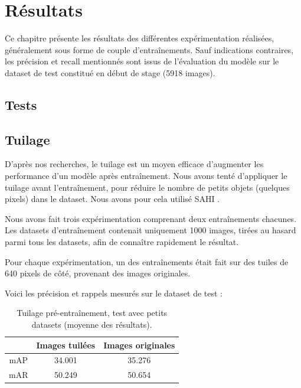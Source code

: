 \chapter{Résultats}\label{resultats}

Ce chapitre présente les résultats des différentes expérimentation réalisées, 
généralement sous forme de couple d'entraînements. Sauf indications contraires, 
les précision et recall mentionnés sont issus de l'évaluation du modèle sur le 
dataset de test constitué en début de stage (5918 images).

\section{Tests}


\section{Tuilage}

D'après nos recherches, le tuilage est un moyen efficace d'augmenter les performance d'un modèle après 
entraînement. Nous avons tenté d'appliquer le tuilage avant 
l'entraînement, pour réduire le nombre de petits objets (quelques pixels) dans le dataset. 
Nous avons pour cela utilisé SAHI \cite{Akyon_Altinuc_Temizel_2022}.

Nous avons fait trois expérimentation comprenant deux entraînements chacunes. 
Les datasets d'entraînement contenait uniquement 1000 images, tirées au hasard parmi tous les datasets, 
afin de connaître rapidement le résultat. 

Pour chaque expérimentation, un des entraînements était fait sur des tuiles de 640 pixels de côté, 
provenant des images originales. 

Voici les précision et rappels mesurés sur le dataset de test :\\

\begin{table}[h]
    \begin{center}
        \begin{tabular}{c c c}
            \hline
            & Images tuilées & Images originales \\
            \hline
            mAP & 34.001 & 35.276 \\
            mAR & 50.249 & 50.654 \\
        \end{tabular}
    \end{center}
    \caption{Tuilage pré-entraînement, test avec petits datasets (moyenne des résultats).}
\end{table}

